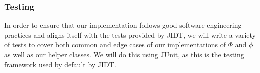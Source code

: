 \documentclass[a4paper,11pt]{article}
\begin{document}
\subsubsection{Testing}
In order to ensure that our implementation follows good software engineering practices and aligns itself with the tests provided by JIDT, we will write a variety of tests to cover both common and edge cases of our implementations of $\Phi$ and $\phi$ as well as our helper classes. We will do this using JUnit, as this is the testing framework used by default by JIDT.


\clearpage

{}
\clearpage
\end{document}
